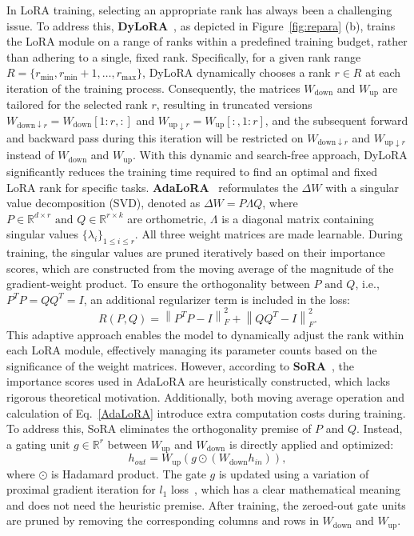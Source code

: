 In LoRA training, selecting an appropriate rank has always been a challenging issue. 
To address this, \textbf{DyLoRA}~\cite{valipour2022dylora}, as depicted in Figure~\ref{fig:repara} (b), trains the LoRA module on a range of ranks within a predefined training budget, rather than adhering to a single, fixed rank. Specifically, for a given rank range $R = \{ r_{\text{min}}, r_{\text{min}}+1, \ldots, r_{\text{max}} \}$, DyLoRA dynamically chooses a rank $r \in R$ at each iteration of the training process. Consequently, the matrices $W_{\text{down}}$ and $W_{\text{up}}$ are tailored for the selected rank $r$, resulting in truncated versions $W_{\text{down}\downarrow r} = W_{\text{down}}[1:r, :]$ and $W_{\text{up} \downarrow r} = W_{\text{up}}[:, 1:r]$, and the subsequent forward and backward pass during this iteration will be restricted on $W_{\text{down}\downarrow r}$ and $W_{\text{up} \downarrow r}$ instead of $W_{\text{down}}$ and $W_{\text{up}}$. With this dynamic and search-free approach, DyLoRA significantly reduces the training time required to find an optimal and fixed LoRA rank for specific tasks.
\textbf{AdaLoRA}~\cite{adalora} reformulates the $\Delta W$ with a singular value decomposition (SVD), denoted as $\Delta W = P \Lambda Q$, where $P \in \mathbb{R}^{d \times r} \text{ and } Q \in \mathbb{R}^{r \times k}$ are orthometric, $\Lambda$ is a diagonal matrix containing singular values $\{\lambda_i\}_{1 \leq i \leq r}$. All three weight matrices are made learnable. 
During training, the singular values are pruned iteratively based on their importance scores, which are constructed from the moving average of the magnitude of the gradient-weight product. To ensure the orthogonality between $P \text{ and }Q$, i.e., $P^TP = QQ^T = I$, an additional regularizer term is included in the loss:
\begin{equation}
\label{AdaLoRA}
    R(P,Q) = \left\| P^T P - I \right\|_F^2 + \left\| QQ^T - I \right\|_F^2.
\end{equation}
This adaptive approach enables the model to dynamically adjust the rank within each LoRA module, effectively managing its parameter counts based on the significance of the weight matrices. However, according to \textbf{SoRA}~\cite{SORA}, the importance scores used in AdaLoRA are heuristically constructed, which lacks rigorous theoretical motivation. Additionally, both moving average operation and calculation of Eq.~\ref{AdaLoRA} introduce extra computation costs during training. To address this, SoRA eliminates the orthogonality premise of $P$ and $Q$. Instead, a gating unit $g \in \mathbb{R}^ r$ between $W_{\text{up}}$ and $W_{\text{down}}$ is directly applied and optimized:
\begin{equation}
    h_{out} =  W_{\text{up}}(g \odot (W_{\text{down}}h_{in})),
\end{equation}
where $\odot$ is Hadamard product. The gate $g$ is updated using a variation of proximal gradient iteration for $l_1$ loss~\cite{beck2009fast, chambolle1998nonlinear}, which has a clear mathematical meaning and does not need the heuristic premise. After training, the zeroed-out gate units are pruned by removing the corresponding columns and rows in $W_{\text{down}}$ and $W_{\text{up}}$. 

